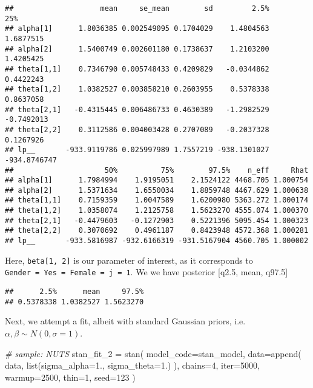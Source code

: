 \documentclass[
]{article}
\newenvironment{Shaded}{\begin{snugshade}}{\end{snugshade}}
\newcommand{\AttributeTok}[1]{\textcolor[rgb]{0.77,0.63,0.00}{#1}}
\newcommand{\CommentTok}[1]{\textcolor[rgb]{0.56,0.35,0.01}{\textit{#1}}}
\newcommand{\DecValTok}[1]{\textcolor[rgb]{0.00,0.00,0.81}{#1}}
\newcommand{\FloatTok}[1]{\textcolor[rgb]{0.00,0.00,0.81}{#1}}
\newcommand{\FunctionTok}[1]{\textcolor[rgb]{0.00,0.00,0.00}{#1}}
\newcommand{\NormalTok}[1]{#1}
\newcommand{\OtherTok}[1]{\textcolor[rgb]{0.56,0.35,0.01}{#1}}
\newcommand{\SpecialCharTok}[1]{\textcolor[rgb]{0.00,0.00,0.00}{#1}}
\begin{document}
\begin{verbatim}
##                    mean     se_mean        sd         2.5%          25%
## alpha[1]      1.8036385 0.002549095 0.1704029    1.4804563    1.6877515
## alpha[2]      1.5400749 0.002601180 0.1738637    1.2103200    1.4205425
## theta[1,1]    0.7346790 0.005748433 0.4209829   -0.0344862    0.4422243
## theta[1,2]    1.0382527 0.003858210 0.2603955    0.5378338    0.8637058
## theta[2,1]   -0.4315445 0.006486733 0.4630389   -1.2982529   -0.7492013
## theta[2,2]    0.3112586 0.004003428 0.2707089   -0.2037328    0.1267926
## lp__       -933.9119786 0.025997989 1.7557219 -938.1301027 -934.8746747
##                     50%          75%        97.5%    n_eff     Rhat
## alpha[1]      1.7984994    1.9195051    2.1524122 4468.705 1.000754
## alpha[2]      1.5371634    1.6550034    1.8859748 4467.629 1.000638
## theta[1,1]    0.7159359    1.0047589    1.6200980 5363.272 1.000174
## theta[1,2]    1.0358074    1.2125758    1.5623270 4555.074 1.000370
## theta[2,1]   -0.4479603   -0.1272903    0.5221396 5095.454 1.000323
## theta[2,2]    0.3070692    0.4961187    0.8423948 4572.368 1.000281
## lp__       -933.5816987 -932.6166319 -931.5167904 4560.705 1.000002
\end{verbatim}

Here, \texttt{beta{[}1,\ 2{]}} is our parameter of interest, as it
corresponds to \texttt{Gender\ =\ Yes\ =\ Female\ =\ j\ =\ 1}. We we
have posterior {[}q2.5, mean, q97.5{]}

\begin{Shaded}
\end{Shaded}

\begin{verbatim}
##      2.5%      mean     97.5% 
## 0.5378338 1.0382527 1.5623270
\end{verbatim}

Next, we attempt a fit, albeit with standard Gaussian priors,
i.e.~\(\alpha, \beta \sim N(0, \sigma=1)\).

\begin{Shaded}
\begin{Highlighting}[]
\CommentTok{\# sample: NUTS}
\NormalTok{stan\_fit\_2 }\OtherTok{=} \FunctionTok{stan}\NormalTok{(}
  \AttributeTok{model\_code=}\NormalTok{stan\_model,}
  \AttributeTok{data=}\FunctionTok{append}\NormalTok{(}
\NormalTok{    data,}
    \FunctionTok{list}\NormalTok{(}\AttributeTok{sigma\_alpha=}\FloatTok{1.}\NormalTok{, }\AttributeTok{sigma\_theta=}\FloatTok{1.}\NormalTok{)}
\NormalTok{  ),}
  \AttributeTok{chains=}\DecValTok{4}\NormalTok{,}
  \AttributeTok{iter=}\DecValTok{5000}\NormalTok{,}
  \AttributeTok{warmup=}\DecValTok{2500}\NormalTok{,}
  \AttributeTok{thin=}\DecValTok{1}\NormalTok{,}
  \AttributeTok{seed=}\DecValTok{123}
\NormalTok{)}
\end{Highlighting}
\end{Shaded}
\end{document}
